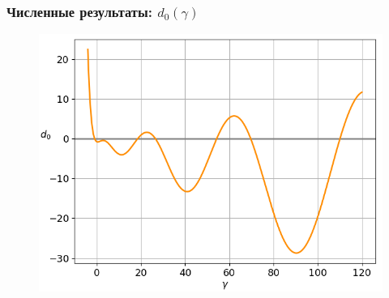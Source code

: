 \documentclass[fullscreen=true, unicode, bookmarks=false]{beamer}
\begin{document}
\begin{frame}
\frametitle{ Численные результаты: $ d_0(\gamma) $ }

\begin{figure}[h]
\includegraphics[scale=0.6]{integral_divergent_d0.png} 
\end{figure}

\end{frame}

\begin{frame}
\titlepage
\end{frame} 
\end{document}
